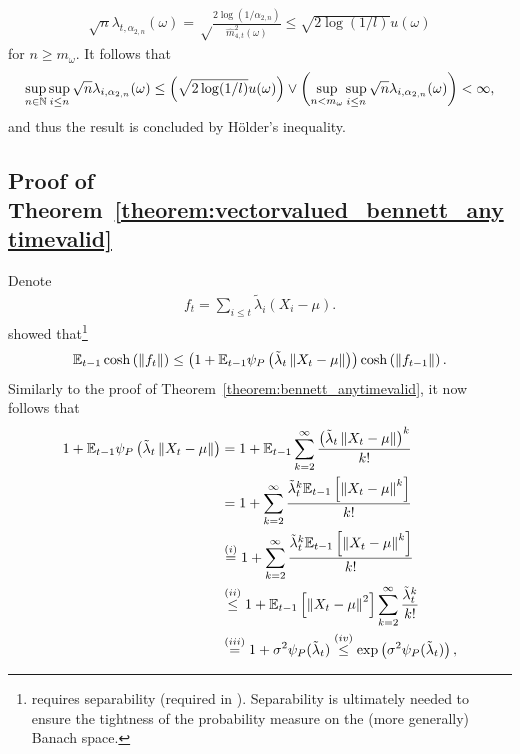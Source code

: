     \begin{align*}
        \sqrt{n}\lambda_{t,\alpha_{2, n}}(\omega) = \sqrt\frac{2\log(1/\alpha_{2, n})}{\widehat m_{4, t}^2(\omega)} \leq \sqrt{2\log(1/l)} u(\omega)
    \end{align*}
for $n \geq m_\omega$. It follows that
\begin{align*}
    \sup_{n\in\mathbb{N}}\sup_{i \leq n} \sqrt{n} \lambda_{i, \alpha_{2, n}}(\omega) \leq \left( \sqrt{2\log(1/l)} u(\omega) \right)\vee\left( \sup_{n < m_\omega}\sup_{i \leq n} \sqrt{n} \lambda_{i, \alpha_{2, n}}(\omega)\right) < \infty,
\end{align*}
and thus the result is concluded by Hölder's inequality.

\subsection{Proof of Theorem~\ref{theorem:vectorvalued_bennett_anytimevalid}} \label{proof:vectorvalued_bennett_anytimevalid}
Denote 
    \begin{align*}
        f_t = \sum_{i \leq t}\tilde\lambda_i (X_i-\mu).
    \end{align*}
    \citet[Theorem 3.2]{pinelis1994optimum} showed that\footnote{\citet[Theorem 3.2]{pinelis1994optimum} requires separability (required in \citet[Lemma 2.3]{pinelis1994optimum}). Separability is ultimately needed to ensure the tightness of the probability measure on the (more generally) Banach space.} 
    \begin{align*}
        \mathbb{E}_{t-1} \cosh \left( \left\| f_t \right\|  \right) \leq \left( 1 + \mathbb{E}_{t-1}\psi_P\left( \tilde\lambda_t \left\| X_t - \mu \right\| \right)  \right) \cosh \left( \left\| f_{t-1} \right\|  \right).
    \end{align*} 
    Similarly to the proof of Theorem~\ref{theorem:bennett_anytimevalid}, it now follows that
    \begin{align*}
        1+\mathbb{E}_{t-1}\psi_P\left( \tilde\lambda_t \left\| X_t - \mu \right\| \right) &= 1+\mathbb{E}_{t-1} \sum_{k = 2}^\infty \frac{\left( \tilde\lambda_t \left\| X_t-\mu\right\|\right)^k}{k!} 
        \\&=  1+\sum_{k = 2}^\infty \frac{\tilde\lambda_t^k \mathbb{E}_{t-1} \left[ \left\| X_t-\mu\right\|^k \right]}{k!}
        \\&\stackrel{(i)}{=} 1 + \sum_{k = 2}^\infty \frac{\tilde\lambda_t^k \mathbb{E}_{t-1} \left[ \left\| X_t-\mu \right\|^k \right]}{k!}
        \\&\stackrel{(ii)}{\leq} 1 + \mathbb{E}_{t-1} \left[ \left\| X_t-\mu\right\|^2 \right]\sum_{k = 2}^\infty \frac{\tilde\lambda_t^k }{k!}
        \\&\stackrel{(iii)}{=} 1 + \sigma^2 \psi_P(\tilde\lambda_t)
        \stackrel{(iv)}{\leq} \exp \left( \sigma^2 \psi_P(\tilde\lambda_t) \right),
    \end{align*}
